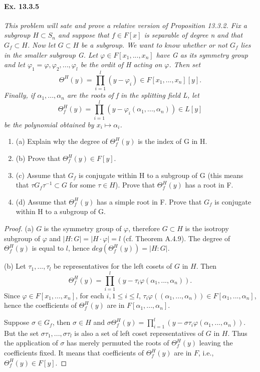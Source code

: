 \documentclass[11pt,a4paper]{article}
\newcommand{\be} {\begin{enumerate}}
\newcommand{\ee} {\end{enumerate}}
\begin{document}
\paragraph{Ex. 13.3.5}

{\it This problem will sate and prove a relative version of Proposition 13.3.2. Fix a subgroup $H\subset S_n$ and suppose that $f\in F[x]$ is separable of degree n and that $G_f \subset H$. Now let $G \subset H$ be a subgroup. We want to know whether or not $G_f$ lies in the smaller subgroup G. Let $\varphi \in F[x_1,...,x_n]$ have G as its symmetry group and let $\varphi_1=\varphi,\varphi_2,...,\varphi_l$ be the ordit of H acting on $\varphi$. Then set $$\Theta^H(y)=\prod_{i=1}^l ( y - \varphi_i) \in F[x_1,...,x_n][y].$$ Finally, if $\alpha_1,...,\alpha_n$ are the roots of f in the splitting field L, let $$\Theta_f^H(y)=\prod_{i=1}^l ( y - \varphi_i(\alpha_1,...,\alpha_n))\in L[y]$$  be the polynomial obtained by $x_i \mapsto \alpha_i$.
\be
\item[(a)] Explain why the degree of $\Theta_f^H(y)$ is the index of G in H.
\item[(b)] Prove that $\Theta_f^H(y) \in F[y]$.
\item[(c)] Assume that $G_f$ is conjugate within H to a subgroup of G (this means that $\tau G_f \tau^{-1} \subset G$ for some $\tau \in H$). Prove that $\Theta_f^H(y)$ has a root in F.
\item[(d)] Assume that $\Theta_f^H(y)$ has a simple root in F. Prove that $G_f$ is conjugate within H to a subgroup of G.
\ee
\begin{proof}
\item[(a)] $G$ is the symmetry group of $\varphi$, therefore $G\subset H$ is the isotropy subgroup of $\varphi$ and $|H:G|=|H\cdot \varphi|=l$ (cf. Theorem A.4.9). The degree of $\Theta_f^H(y)$ is equal to $l$, hence $deg(\Theta_f^H(y))=|H:G|$. 
\item[(b)] Let $\tau_1,...,\tau_l$ be representatives for the left cosets of $G$ in $H$. Then $$\Theta_f^H(y)=\prod_{i=1}^l ( y - \tau_i\varphi(\alpha_1,...,\alpha_n)).$$ Since $\varphi \in F [x_1,...,x_n]$, for each $i, 1\leq i \leq l$, $\tau_i\varphi((\alpha_1,...,\alpha_n))\in F [\alpha_1,...,\alpha_n]  $, hence the coefficients of $\Theta_f^H(y)$ are in $F [\alpha_1,...,\alpha_n]  $.

Suppose $\sigma \in G_f$, then $\sigma \in H$ and $\sigma\Theta_f^H(y)=\prod_{i=1}^l ( y - \sigma\tau_i\varphi(\alpha_1,...,\alpha_n))$. But the set $\sigma\tau_1,...,\sigma\tau_l$ is also a set of left coset representatives of $G$ in $H$. Thus the application of $\sigma$ has merely permuted the roots of $\Theta_f^H(y)$ leaving the coefficients fixed. It means that coefficients of $\Theta_f^H(y)$ are in $F$, i.e., $\Theta_f^H(y) \in F[y]$. 


\end{proof}}
\end{document}
